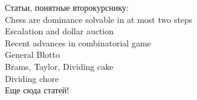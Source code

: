 \documentclass[pdftex,12pt,a4paper]{article}
\begin{document}
Статьи, понятные второкурснику: \\
Chess are dominance solvable in at most two steps \\
Escalation and dollar auction \\
Recent advances in combinatorial game \\
General Blotto \\
Brams, Taylor, Dividing cake \\
Dividing chore \\

Еще сюда статей!



\newpage
\begin{comment}
\section{Неправильно занумерованные ответы :)}

1.4. а) нет б) да (рисунок) \\
1.5. одну \\

1.8. а) верно б) неверно в) неверно \\
1.9. 7:1 \\

2.1. а) $t_{2}$ \\
2.5. возможная матрица: $\begin{array}{c|cc}
& + & - \\
\hline
+ & (0;0) & (1;-1) \\
- & (-1;1) & (0;0) \\
\end{array}$, NE - $(+;+)$ \\
Мораль: можно добится нужного исхода голосования пообещав деньги, но не выплачивая ни копейки. \\
2.7. $u_{1}(x_{1},x_{2})=\frac{3}{4}(x_{1}+x_{2})-x_{1}$ \\
$u_{2}(x_{1},x_{2})=\frac{3}{4}(x_{1}+x_{2})-x_{2}$ \\
NE - $(x_{1}=0,x_{2}=0)$ \\
2.8. а) верно б) верно в) Если стратегию можно вычеркнуть, то сделать это никогда не поздно \\
2.9. нет \\
2.10. а) называемая им цена б) верно \\


\end{comment}
\end{document}
